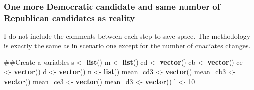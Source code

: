 \documentclass[]{article}
\newenvironment{Shaded}{\begin{snugshade}}{\end{snugshade}}
\newcommand{\KeywordTok}[1]{\textcolor[rgb]{0.13,0.29,0.53}{\textbf{#1}}}
\newcommand{\DataTypeTok}[1]{\textcolor[rgb]{0.13,0.29,0.53}{#1}}
\newcommand{\DecValTok}[1]{\textcolor[rgb]{0.00,0.00,0.81}{#1}}
\newcommand{\StringTok}[1]{\textcolor[rgb]{0.31,0.60,0.02}{#1}}
\newcommand{\ControlFlowTok}[1]{\textcolor[rgb]{0.13,0.29,0.53}{\textbf{#1}}}
\newcommand{\OperatorTok}[1]{\textcolor[rgb]{0.81,0.36,0.00}{\textbf{#1}}}
\newcommand{\NormalTok}[1]{#1}
\begin{document}
\subsubsection{One more Democratic candidate and same number of
Republican candidates as
reality}\label{one-more-democratic-candidate-and-same-number-of-republican-candidates-as-reality}

I do not include the comments between each step to save space. The
methodology is exactly the same as in scenario one except for the number
of cnadiates changes.

\begin{Shaded}
\begin{Highlighting}[]
\NormalTok{##Create a variables}
\NormalTok{s <-}\StringTok{ }\KeywordTok{list}\NormalTok{()}
\NormalTok{m <-}\StringTok{ }\KeywordTok{list}\NormalTok{()}
\NormalTok{cd <-}\StringTok{ }\KeywordTok{vector}\NormalTok{()}
\NormalTok{cb <-}\StringTok{ }\KeywordTok{vector}\NormalTok{()}
\NormalTok{ce <-}\StringTok{ }\KeywordTok{vector}\NormalTok{()}
\NormalTok{d <-}\StringTok{ }\KeywordTok{vector}\NormalTok{()}
\NormalTok{n <-}\StringTok{ }\KeywordTok{list}\NormalTok{()}
\NormalTok{mean_cd3 <-}\StringTok{ }\KeywordTok{vector}\NormalTok{()}
\NormalTok{mean_cb3 <-}\StringTok{ }\KeywordTok{vector}\NormalTok{()}
\NormalTok{mean_ce3 <-}\StringTok{ }\KeywordTok{vector}\NormalTok{()}
\NormalTok{mean_d3 <-}\StringTok{ }\KeywordTok{vector}\NormalTok{()}
\NormalTok{l <-}\StringTok{ }\DecValTok{10}
\end{Highlighting}
\end{Shaded}

\begin{Shaded}
\end{Shaded}
\end{document}
